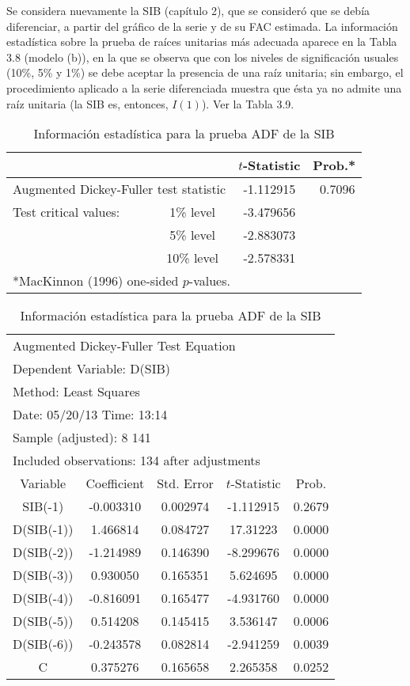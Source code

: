 \begin{ejemplo}
Se considera nuevamente la SIB (cap\'{i}tulo 2), que se consider\'{o} que se deb\'{i}a diferenciar, a partir del gr\'{a}fico de la serie y de su FAC estimada. La informaci\'{o}n estad\'{i}stica sobre la prueba de ra\'{i}ces unitarias m\'{a}s adecuada aparece en la Tabla 3.8 (modelo (b)), en la que se observa que con los niveles de significaci\'{o}n usuales (10{\%}, 5{\%} y 1{\%}) se debe aceptar la presencia de una ra\'{i}z unitaria; sin embargo, el procedimiento aplicado a la serie diferenciada muestra que \'{e}sta ya no admite una ra\'{i}z unitaria (la SIB es, entonces, $I(1)$). Ver la Tabla 3.9.

\begin{table}[H]
\centering\small
\caption{Informaci\'{o}n estad\'{i}stica para la prueba ADF de la SIB}
\begin{tabular}{lccc}
\toprule
& & $t$-Statistic& Prob.* \\
\midrule
\multicolumn{2}{l}{Augmented Dickey-Fuller test statistic} & -1.112915& ~0.7096 \\
\midrule
Test critical values:& 1{\%} level&  -3.479656&  \\
& 5{\%} level& -2.883073&  \\
& 10{\%} level& -2.578331&  \\
\bottomrule
\multicolumn{4}{l}{*MacKinnon (1996) one-sided $p$-values.}
\end{tabular}

\vspace{8mm}
\begin{tabular}{ccccc}
\multicolumn{4}{l}{Augmented Dickey-Fuller Test Equation}  \\
\multicolumn{4}{l}{Dependent Variable: D(SIB)} \\
\multicolumn{4}{l}{Method: Least Squares} \\
\multicolumn{4}{l}{Date: 05/20/13 Time: 13:14} \\
\multicolumn{4}{l}{Sample (adjusted): 8 141}  \\
\multicolumn{4}{l}{Included observations: 134 after adjustments}  \\
\toprule
Variable& Coefficient& Std. Error& $t$-Statistic& Prob. \\
\midrule
SIB(-1)& -0.003310& 0.002974& -1.112915& 0.2679 \\
D(SIB(-1))& 1.466814& 0.084727& 17.31223& 0.0000 \\
D(SIB(-2))& -1.214989& 0.146390& -8.299676& 0.0000 \\
D(SIB(-3))& 0.930050& 0.165351& 5.624695& 0.0000 \\
D(SIB(-4))& -0.816091& 0.165477& -4.931760& 0.0000 \\
D(SIB(-5))& 0.514208& 0.145415& 3.536147& 0.0006 \\
D(SIB(-6))& -0.243578& 0.082814& -2.941259& 0.0039 \\
C& 0.375276& 0.165658& 2.265358& 0.0252 \\
\bottomrule
\end{tabular}
\end{table}



\end{ejemplo}
